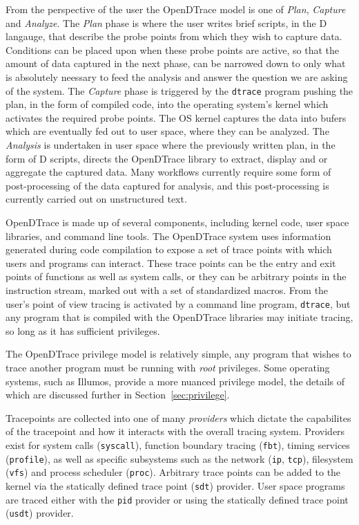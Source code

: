 From the perspective of the user the OpenDTrace model is one of
\emph{Plan}, \emph{Capture} and \emph{Analyze}.  The \emph{Plan} phase
is where the user writes brief scripts, in the D langauge, that
describe the probe points from which they wish to capture data.
Conditions can be placed upon when these probe points are active, so
that the amount of data captured in the next phase, can be narrowed
down to only what is absolutely neessary to feed the analysis and
answer the question we are asking of the system.  The \emph{Capture}
phase is triggered by the \texttt{dtrace} program pushing the plan,
in the form of compiled code, into the operating system's kernel which
activates the required probe points.  The OS kernel captures the data
into bufers which are eventually fed out to user space, where they can
be analyzed.  The \emph{Analysis} is undertaken in user space where
the previously written plan, in the form of D scripts, directs the
OpenDTrace library to extract, display and or aggregate the captured
data.  Many workflows currently require some form of post-processing
of the data captured for analysis, and this post-processing is
currently carried out on unstructured text.

OpenDTrace is made up of several components, including kernel code,
user space libraries, and command line tools.  The OpenDTrace system
uses information generated during code compilation to expose a set of
trace points with which users and programs can interact.  These trace
points can be the entry and exit points of functions as well as system
calls, or they can be arbitrary points in the instruction stream,
marked out with a set of standardized macros.  From the user's point
of view tracing is activated by a command line program,
\texttt{dtrace}, but any program that is compiled with the OpenDTrace
libraries may initiate tracing, so long as it has sufficient
privileges.

The OpenDTrace privilege model is relatively simple, any program that
wishes to trace another program must be running with \emph{root}
privileges.  Some operating systems, such as Illumos, provide a more
nuanced privilege model, the details of which are discussed further in
Section~\ref{sec:privilege}.

Tracepoints are collected into one of many \emph{providers} which dictate
the capabilites of the tracepoint and how it interacts with the overall
tracing system.  Providers exist for system calls (\texttt{syscall}),
function boundary tracing (\texttt{fbt}), timing services (\texttt{profile}),
as well as specific subsystems such as the network (\texttt{ip}, \texttt{tcp}),
filesystem (\texttt{vfs}) and process scheduler (\texttt{proc}).
Arbitrary trace points can be added to the kernel via the
statically defined trace point (\texttt{sdt}) provider.  User space programs
are traced either with the \texttt{pid} provider or using the 
statically defined trace point (\texttt{usdt}) provider.  

